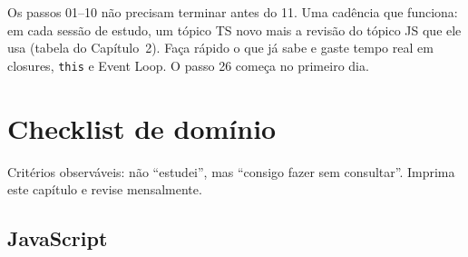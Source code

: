 \documentclass[12pt,a4paper,oneside]{book}
\newcommand{\code}[1]{\texttt{#1}}
\begin{document}
\begin{nota}
Os passos 01--10 não precisam terminar antes do 11. Uma cadência que funciona: em cada sessão de estudo, um tópico TS novo mais a revisão do tópico JS que ele usa (tabela do Capítulo~2). Faça rápido o que já sabe e gaste tempo real em closures, \code{this} e Event Loop. O passo 26 começa no primeiro dia.
\end{nota}

\chapter{Checklist de domínio}
\label{cap:checklist}

Critérios observáveis: não ``estudei'', mas ``consigo fazer sem consultar''. Imprima este capítulo e revise mensalmente.

\section{JavaScript}
\end{document}
